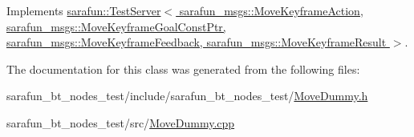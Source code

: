 Implements \hyperlink{classsarafun_1_1TestServer_a85b9721105c2a4b46bae26428433513e}{sarafun\-::\-Test\-Server$<$ sarafun\-\_\-msgs\-::\-Move\-Keyframe\-Action, sarafun\-\_\-msgs\-::\-Move\-Keyframe\-Goal\-Const\-Ptr, sarafun\-\_\-msgs\-::\-Move\-Keyframe\-Feedback, sarafun\-\_\-msgs\-::\-Move\-Keyframe\-Result $>$}.



The documentation for this class was generated from the following files\-:\begin{DoxyCompactItemize}
\item 
sarafun\-\_\-bt\-\_\-nodes\-\_\-test/include/sarafun\-\_\-bt\-\_\-nodes\-\_\-test/\hyperlink{MoveDummy_8h}{Move\-Dummy.\-h}\item 
sarafun\-\_\-bt\-\_\-nodes\-\_\-test/src/\hyperlink{MoveDummy_8cpp}{Move\-Dummy.\-cpp}\end{DoxyCompactItemize}
